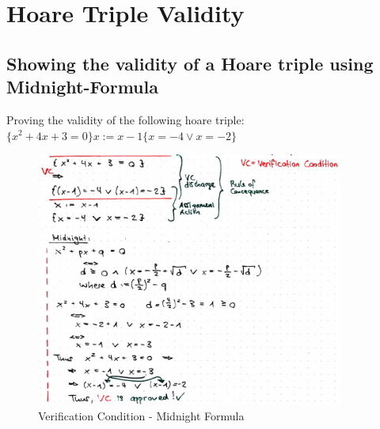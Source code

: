 \section{Hoare Triple Validity}

\subsection{Showing the validity of a Hoare triple using Midnight-Formula}

Proving the validity of the following hoare triple: $\{x^2 + 4x + 3 = 0\} x := x - 1 \{ x = -4 \lor x = -2 \}$

\begin{figure}[H]
\centering
\includegraphics[width=0.9\textwidth]{figures/hoareTripleMidnight.png}
\caption{Verification Condition - Midnight Formula}
\end{figure}